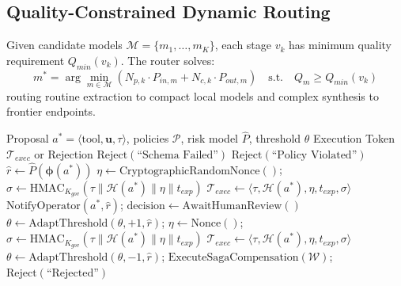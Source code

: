 \documentclass[conference]{IEEEtran}
\begin{document}
\subsection{Quality-Constrained Dynamic Routing}
Given candidate models $\mathcal{M} = \{m_1, \dots, m_K\}$, each stage $v_k$ has minimum quality requirement $Q_{min}(v_k)$. The router solves:
\begin{equation}
m^* = \arg\min_{m \in \mathcal{M}} \left( N_{p, k} \cdot P_{in, m} + N_{c, k} \cdot P_{out, m} \right) \quad \text{s.t.} \quad Q_m \ge Q_{min}(v_k)
\end{equation}
routing routine extraction to compact local models and complex synthesis to frontier endpoints.

\begin{algorithm}[t]
\caption{Deterministic Governance and Token Issuance}
\label{alg:governance}
\begin{algorithmic}[1]
\footnotesize
\REQUIRE Proposal $a^* = \langle \text{tool}, \mathbf{u}, \tau \rangle$, policies $\mathcal{P}$, risk model $\hat{P}$, threshold $\theta$
\ENSURE Execution Token $\mathcal{T}_{exec}$ or Rejection
 \RETURN $\text{Reject}(\text{``Schema Failed''})$ \ENDIF
{} \RETURN $\text{Reject}(\text{``Policy Violated''})$ \ENDIF
\STATE $\hat{r} \leftarrow \hat{P}(\boldsymbol{\phi}(a^*))$ 
    \STATE $\eta \leftarrow \text{CryptographicRandomNonce}()$; $\sigma \leftarrow \text{HMAC}_{K_{gov}}(\tau \parallel \mathcal{H}(a^*) \parallel \eta \parallel t_{exp})$
    \RETURN $\mathcal{T}_{exec} \leftarrow \langle \tau, \mathcal{H}(a^*), \eta, t_{exp}, \sigma \rangle$
\ELSE
    \STATE $\text{NotifyOperator}(a^*, \hat{r})$; $\text{decision} \leftarrow \text{AwaitHumanReview}()$
        \STATE $\theta \leftarrow \text{AdaptThreshold}(\theta, +1, \hat{r})$; $\eta \leftarrow \text{Nonce}()$; $\sigma \leftarrow \text{HMAC}_{K_{gov}}(\tau \parallel \mathcal{H}(a^*) \parallel \eta \parallel t_{exp})$
        \RETURN $\mathcal{T}_{exec} \leftarrow \langle \tau, \mathcal{H}(a^*), \eta, t_{exp}, \sigma \rangle$
    \ELSE
        \STATE $\theta \leftarrow \text{AdaptThreshold}(\theta, -1, \hat{r})$; $\text{ExecuteSagaCompensation}(\mathcal{W})$; \RETURN $\text{Reject}(\text{``Rejected''})$
    \ENDIF
\ENDIF
\end{algorithmic}
\end{algorithm}
\end{document}
